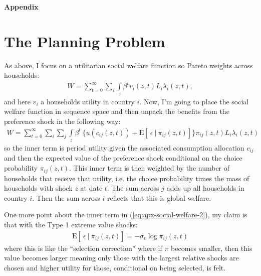 \documentclass[12pt,pdftex]{article}
\begin{document}
\begin{onehalfspacing}
\clearpage
\newpage

\begin{center}
\textbf{\Large Appendix}
\end{center}


\section{The Planning Problem}\label{sec:apx-planner}

As above, I focus on a utilitarian social welfare function so Pareto weights across households:
\begin{align}
W = \sum_{t=0}^{\infty} \sum_{i} \int\limits_{z} \beta^{t} v_{i}(z,t) L_{i}\lambda_{i}(z,t),
\label{eq:apx-social-welfare}
\end{align}
and here $v_i$ a households utility in country $i$. Now, I'm going to place the social welfare function in sequence space and then unpack the benefits from the preference shock in the following way:
\begin{align}
W = \sum_{t=0}^{\infty}  \sum_{i} \sum_{j} \int\limits_{z}  \beta^{t} \  \bigg \{  u(c_{ij}(z, t) ) + \mathrm{E}[ \ \epsilon \ | \ \pi_{ij}(z,t) ] \bigg \}\pi_{ij}(z,t) L_{i} \lambda_{i}(z, t)
\label{eq:apx-social-welfare-2}
\end{align}
so the inner term is period utility given the associated consumption allocation $c_{ij}$ and then the expected value of the preference shock conditional on the choice probability $\pi_{ij}(z,t)$. This inner term is then weighted by the number of households that receive that utility, i.e. the choice probability times the mass of households with shock $z$ at date $t$. The sum across $j$ adds up all households in country $i$. Then the sum across $i$ reflects that this is global welfare.

One more point about the inner term in (\ref{eq:apx-social-welfare-2}), my claim is that with the Type 1 extreme value shocks:
\begin{align}
\mathrm{E}[ \ \epsilon \ | \ \pi_{ij}(z,t) ] = -\sigma_{\epsilon} \log \pi_{ij}(z,t)
\end{align}
where this is like the ``selection correction'' where if $\pi$ becomes smaller, then this value becomes larger meaning only those with the largest relative shocks are chosen and higher utility for those, conditional on being selected, is felt.


\end{onehalfspacing}
\end{document}
